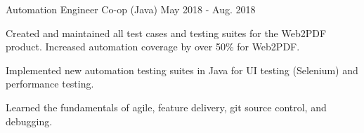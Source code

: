 \begin{cventries}
  \cventry
    {Automation Engineer Co-op (Java)} %
    {} %
    {} %
    {May 2018 - Aug. 2018} %
    {
      \begin{cvitems} %
\item Created and maintained all test cases and testing suites for the Web2PDF product. Increased automation coverage by over 50\% for Web2PDF.
\item Implemented new automation testing suites in Java for UI testing (Selenium) and performance testing.
\item Learned the fundamentals of agile, feature delivery, git source control, and debugging.
      \end{cvitems}
    }

\end{cventries}
